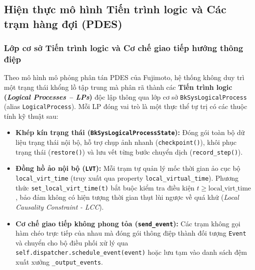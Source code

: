 \subsection{Hiện thực mô hình Tiến trình logic và Các trạm hàng đợi (PDES)}
\label{subsec:pdes-and-queuing-models}

\subsubsection{Lớp cơ sở Tiến trình logic và Cơ chế giao tiếp hướng thông điệp}
\label{subsubsec:logical-process-base}

\hspace{0.5cm}Theo mô hình mô phỏng phân tán PDES của Fujimoto, hệ thống không duy trì một trạng thái khổng lồ tập trung mà phân rã thành các \textbf{Tiến trình logic (\textit{Logical Processes -- LPs})} độc lập thông qua lớp cơ sở \texttt{BkSysLogicalProcess} (alias \texttt{LogicalProcess}). Mỗi LP đóng vai trò là một thực thể tự trị có các thuộc tính kỹ thuật sau:
\begin{itemize}[leftmargin=1.5em, itemsep=2pt]
\item \textbf{Khép kín trạng thái (\texttt{BkSysLogicalProcessState}):} Đóng gói toàn bộ dữ liệu trạng thái nội bộ, hỗ trợ chụp ảnh nhanh (\texttt{checkpoint()}), khôi phục trạng thái (\texttt{restore()}) và lưu vết từng bước chuyển dịch (\texttt{record\_step()}).
\item \textbf{Đồng hồ ảo nội bộ (\texttt{LVT}):} Mỗi trạm tự quản lý mốc thời gian ảo cục bộ \texttt{local\_virt\_time} (truy xuất qua property \texttt{local\_virtual\_time}). Phương thức \texttt{set\_local\_virt\_time(t)} bắt buộc kiểm tra điều kiện $t \ge \text{local\_virt\_time}$, bảo đảm không có hiện tượng thời gian thụt lùi ngược về quá khứ (\textit{Local Causality Constraint - LCC}).
\item \textbf{Cơ chế giao tiếp không phong tỏa (\texttt{send\_event}):} Các trạm không gọi hàm chéo trực tiếp của nhau mà đóng gói thông điệp thành đối tượng \texttt{Event} và chuyển cho bộ điều phối xử lý qua \texttt{self.dispatcher.schedule\_event(event)} hoặc lưu tạm vào danh sách đệm xuất xưởng \texttt{\_output\_events}.
\end{itemize}

